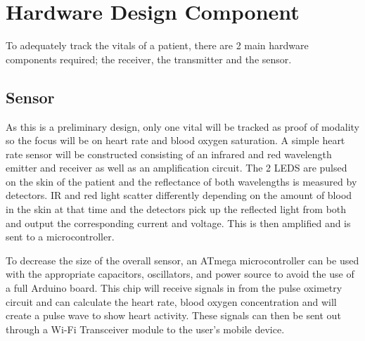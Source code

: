 
\section{Hardware Design Component}

To adequately track the vitals of a patient, there are 2 main hardware components required; the receiver, the transmitter and the sensor.

\subsection{Sensor}
As this is a preliminary design, only one vital will be tracked as proof of modality so the focus will be on heart rate and blood oxygen saturation.
A simple heart rate sensor will be constructed consisting of an infrared and red wavelength emitter and receiver as well as an amplification circuit.
The 2 LEDS are pulsed on the skin of the patient and the reflectance of both wavelengths is measured by detectors. IR and red light scatter differently
depending on the amount of blood in the skin at that time and the detectors pick up the reflected light from both and output the corresponding current and
voltage. This is then amplified and is sent to a microcontroller.

To decrease the size of the overall sensor, an ATmega microcontroller can be used with the appropriate capacitors, oscillators, and power source to avoid the
use of a full Arduino board. This chip will receive signals in from the pulse oximetry circuit and can calculate the heart rate, blood oxygen concentration and
 will create a pulse wave to show heart activity. These signals can then be sent out through a Wi-Fi Transceiver module to the user’s mobile device.
